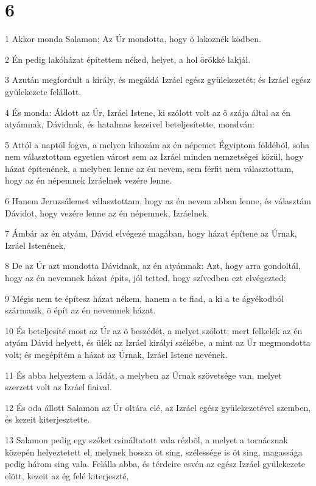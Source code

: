 \chapter{6}

\par 1 Akkor monda Salamon: Az Úr mondotta, hogy õ lakoznék ködben.
\par 2 Én pedig lakóházat építettem néked, helyet, a hol örökké lakjál.
\par 3 Azután megfordult a király, és megáldá Izráel egész gyülekezetét; és Izráel egész gyülekezete felállott.
\par 4 És monda: Áldott az Úr, Izráel Istene, ki szólott volt az õ szája által az én atyámnak, Dávidnak, és hatalmas kezeivel beteljesítette, mondván:
\par 5 Attól a naptól fogva, a melyen kihozám az én népemet Égyiptom földébõl, soha nem választottam egyetlen várost sem az Izráel minden nemzetségei közül, hogy házat építenének, a melyben lenne az én nevem, sem férfit nem választottam, hogy az én népemnek Izráelnek vezére lenne.
\par 6 Hanem Jeruzsálemet választottam, hogy az én nevem abban lenne, és választám Dávidot, hogy vezére lenne az én népemnek, Izráelnek.
\par 7 Ámbár az én atyám, Dávid elvégezé magában, hogy házat építene az Úrnak, Izráel Istenének,
\par 8 De az Úr azt mondotta Dávidnak, az én atyámnak: Azt, hogy arra gondoltál, hogy az én nevemnek házat építs, jól tetted, hogy szívedben ezt elvégezted;
\par 9 Mégis nem te építesz házat nékem, hanem a te fiad, a ki a te ágyékodból származik, õ épít az én nevemnek házat.
\par 10 És beteljesíté most az Úr az õ beszédét, a melyet szólott; mert felkelék az én atyám Dávid helyett, és ülék az Izráel királyi székébe, a mint az Úr megmondotta volt; és megépítém a házat az Úrnak, Izráel Istene nevének.
\par 11 És abba helyeztem a ládát, a melyben az Úrnak szövetsége van, melyet szerzett volt az Izráel fiaival.
\par 12 És oda állott Salamon az Úr oltára elé, az Izráel egész gyülekezetével szemben, és kezeit kiterjesztette.
\par 13 Salamon pedig egy széket csináltatott vala rézbõl, a melyet a tornácznak közepén helyeztetett el, melynek hossza öt sing, szélessége is öt sing, magassága pedig három sing vala. Felálla abba, és térdeire esvén az egész Izráel gyülekezete elõtt, kezeit az ég felé kiterjeszté,
